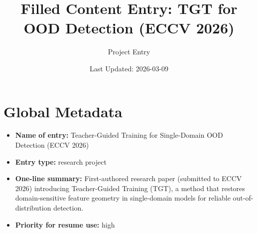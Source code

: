 \documentclass{article}
\title{Filled Content Entry: TGT for OOD Detection (ECCV 2026)}
\author{Project Entry}
\date{Last Updated: 2026-03-09}
\begin{document}
\maketitle

\section*{Global Metadata}
\begin{itemize}
    \item \textbf{Name of entry:} Teacher-Guided Training for Single-Domain OOD Detection (ECCV 2026)
    \item \textbf{Entry type:} research project
    \item \textbf{One-line summary:} First-authored research paper (submitted to ECCV 2026) introducing Teacher-Guided Training (TGT), a method that restores domain-sensitive feature geometry in single-domain models for reliable out-of-distribution detection.
    \item \textbf{Priority for resume use:} high
\end{itemize}
\end{document}

